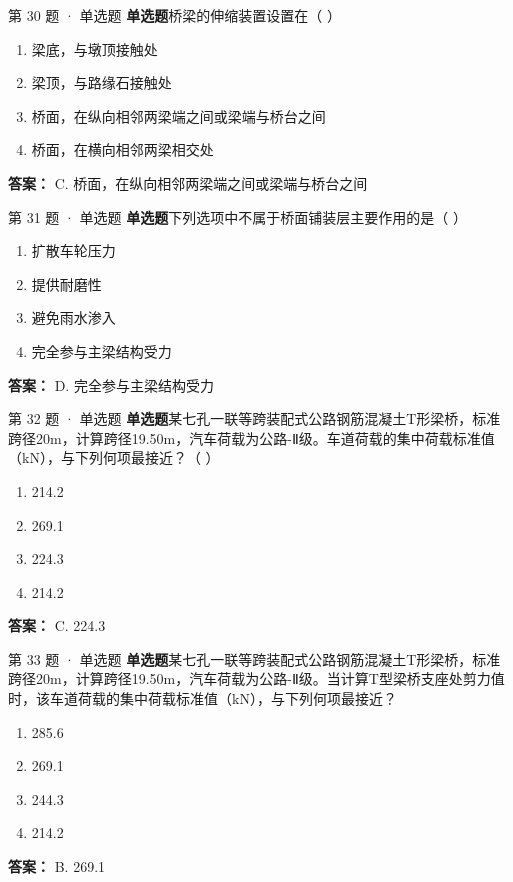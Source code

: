 \documentclass[UTF8,zihao=-4,openany]{ctexbook}
\newenvironment{choices}{\begin{enumerate}[label=\Alph*.,leftmargin=9mm,labelsep=3mm,itemsep=2pt,topsep=4pt]}{\end{enumerate}}
\newcommand{\qtype}[1]{\textcolor{brand}{\sffamily\bfseries #1}}
\begin{document}
\begin{questionbox}{第 30 题 · 单选题}
\qtype{单选题}\quad 桥梁的伸缩装置设置在（ ）
\begin{choices}
\item 梁底，与墩顶接触处
\item 梁顶，与路缘石接触处
\item 桥面，在纵向相邻两梁端之间或梁端与桥台之间
\item 桥面，在横向相邻两梁相交处
\end{choices}
\begin{answerbox}
\textbf{答案：} C. 桥面，在纵向相邻两梁端之间或梁端与桥台之间
\end{answerbox}
\end{questionbox}

\begin{questionbox}{第 31 题 · 单选题}
\qtype{单选题}\quad 下列选项中不属于桥面铺装层主要作用的是（ ）
\begin{choices}
\item 扩散车轮压力
\item 提供耐磨性
\item 避免雨水渗入
\item 完全参与主梁结构受力
\end{choices}
\begin{answerbox}
\textbf{答案：} D. 完全参与主梁结构受力
\end{answerbox}
\end{questionbox}

\begin{questionbox}{第 32 题 · 单选题}
\qtype{单选题}\quad 某七孔一联等跨装配式公路钢筋混凝土T形梁桥，标准跨径20m，计算跨径19.50m，汽车荷载为公路-Ⅱ级。车道荷载的集中荷载标准值（kN），与下列何项最接近？（ ）
\begin{choices}
\item 214.2
\item 269.1
\item 224.3
\item 214.2
\end{choices}
\begin{answerbox}
\textbf{答案：} C. 224.3
\end{answerbox}
\end{questionbox}

\begin{questionbox}{第 33 题 · 单选题}
\qtype{单选题}\quad 某七孔一联等跨装配式公路钢筋混凝土T形梁桥，标准跨径20m，计算跨径19.50m，汽车荷载为公路-Ⅱ级。当计算T型梁桥支座处剪力值时，该车道荷载的集中荷载标准值（kN），与下列何项最接近？
\begin{choices}
\item 285.6
\item 269.1
\item 244.3
\item 214.2
\end{choices}
\begin{answerbox}
\textbf{答案：} B. 269.1
\end{answerbox}
\end{questionbox}
\end{document}
